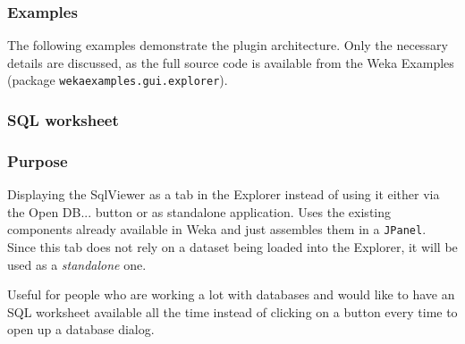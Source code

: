 \subsubsection{Examples}
The following examples demonstrate the plugin architecture. Only the
necessary details are discussed, as the full source code is available from the
Weka Examples \cite{wekaexamples} (package \texttt{wekaexamples.gui.explorer}).

\subsubsection*{SQL worksheet}
\subsubsection*{Purpose}
Displaying the SqlViewer as a tab in the Explorer instead of using it either via
the Open DB... button or as standalone application. Uses the existing components
already available in Weka and just assembles them in a \texttt{JPanel}. Since
this tab does not rely on a dataset being loaded into the Explorer, it will be
used as a \textit{standalone} one.

Useful for people who are working a lot with databases and would like to have an
SQL worksheet available all the time instead of clicking on a button every time
to open up a database dialog.

